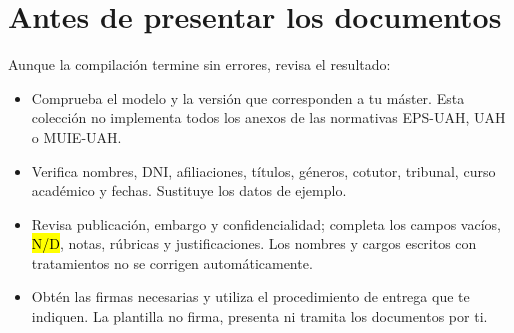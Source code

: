 \documentclass[10pt,a4paper]{article}
\begin{document}
\begin{minipage}{\linewidth}
\section{Antes de presentar los documentos}

Aunque la compilación termine sin errores, revisa el resultado:
\begin{itemize}
  \item Comprueba el modelo y la versión que corresponden a tu máster. Esta colección no implementa todos los anexos de las normativas EPS-UAH, UAH o MUIE-UAH.
  \item Verifica nombres, DNI, afiliaciones, títulos, géneros, cotutor, tribunal, curso académico y fechas. Sustituye los datos de ejemplo.
  \item Revisa publicación, embargo y confidencialidad; completa los campos vacíos, \hl{N/D}, notas, rúbricas y justificaciones. Los nombres y cargos escritos con tratamientos no se corrigen automáticamente.
  \item Obtén las firmas necesarias y utiliza el procedimiento de entrega que te indiquen. La plantilla no firma, presenta ni tramita los documentos por ti.
\end{itemize}
\end{minipage}
\end{document}
